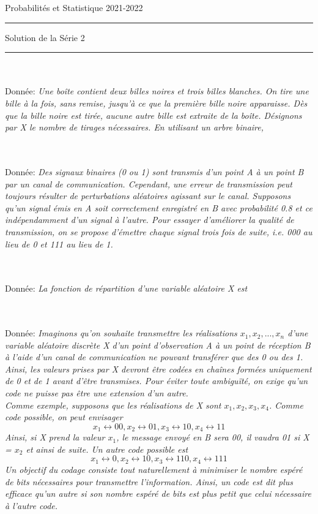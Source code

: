 \documentclass[11pt,a4paper]{report}
\newcounter{num}
\newcommand{\exo}{\addtocounter{num}{1}\noindent{\bf{Exercice \thenum}}\\[-1mm]}
\newcommand{\donnee}[1]{\\{Donnée: } \emph{#1}}
\begin{document}
	 \hfill Probabilités et Statistique\newline 
	 \hfill 2021-2022\newline
	\hrule
	\vspace{3mm}
	 \hfill Solution de la Série 2
	\vspace{5mm}
	\hrule
	\vspace{7mm}
	
	\exo
	\donnee{Une boîte contient deux billes noires et trois billes blanches. On tire une bille à la fois, sans remise,
		jusqu’à ce que la première bille noire apparaisse. Dès que la bille noire est tirée, aucune autre bille est
		extraite de la boîte. Désignons par X le nombre de tirages nécessaires. En utilisant un arbre binaire,}
	
	
	\vspace{1mm}
	
	\exo
	\donnee{Des signaux binaires (0 ou 1) sont transmis d’un point A à un point B par un canal de communication. Cependant, une erreur de transmission peut toujours résulter de perturbations aléatoires agissant sur le canal. Supposons qu’un signal émis en A soit correctement enregistré en B avec probabilité 0.8 et ce indépendamment d’un signal à l’autre. Pour essayer d’améliorer la qualité de transmission, on se propose d’émettre chaque signal trois fois de suite, i.e. 000 au lieu de 0 et 111 au lieu de 1.}
	\vspace{1mm}
	
	\exo
	\donnee{La fonction de répartition d’une variable aléatoire X est}

	\vspace{1mm}
	
	\exo
	\donnee{Imaginons qu’on souhaite transmettre les réalisations $x_1, x_2, . . . , x_n$ d’une variable aléatoire discrète X d’un point d’observation A à un point de réception B à l’aide d’un canal de communication ne pouvant transférer que des 0 ou des 1. Ainsi, les valeurs prises par X devront être codées en chaînes formées uniquement de 0 et de 1 avant d’être transmises. Pour éviter toute ambiguïté, on exige qu’un code ne puisse pas être une extension d’un autre.
	\\Comme exemple, supposons que les réalisations de X sont $x_1, x_2, x_3, x_4$. Comme code possible, on peut envisager
	\\$$x_1 \leftrightarrow 00, x_2 \leftrightarrow 01, x_3 \leftrightarrow 10, x_4 \leftrightarrow 11$$Ainsi, si X prend la valeur $x_1$, le message envoyé en B sera 00, il vaudra 01 si X = $x_2$ et ainsi de suite. Un autre code possible est
	\\$$x_1 \leftrightarrow 0, x_2 \leftrightarrow 10, x_3 \leftrightarrow 110, x_4 \leftrightarrow 111$$Un objectif du codage consiste tout naturellement à minimiser le nombre espéré de bits nécessaires pour transmettre l’information. Ainsi, un code est dit plus efficace qu’un autre si son nombre espéré de bits est plus petit que celui nécessaire à l’autre code.
}
\end{document}
